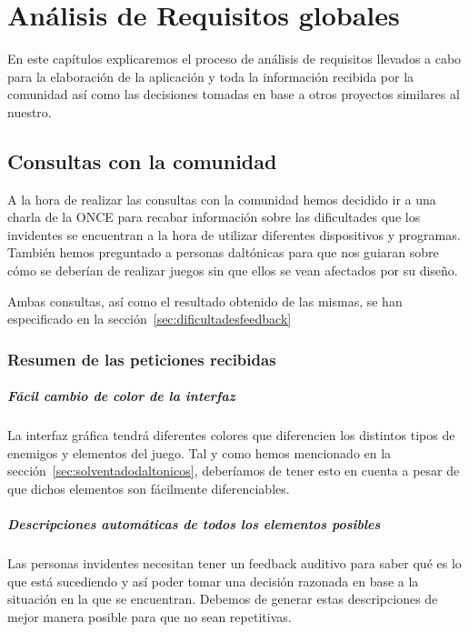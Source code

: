 \chapter[Análisis de Requisitos]{Análisis de Requisitos globales}

En este capítulos explicaremos el proceso de análisis de requisitos llevados a cabo para la elaboración de la aplicación y toda la información recibida por la comunidad así como las decisiones tomadas en base a otros proyectos similares al nuestro.

\section{Consultas con la comunidad}

A la hora de realizar las consultas con la comunidad hemos decidido ir a una charla de la ONCE para recabar información sobre las dificultades que los invidentes se encuentran a la hora de utilizar diferentes dispositivos y programas. 
También hemos preguntado a personas daltónicas para que nos guiaran sobre cómo se deberían de realizar juegos sin que ellos se vean afectados por su diseño.

Ambas consultas, así como el resultado obtenido de las mismas, se han especificado en la sección~\ref{sec:dificultadesfeedback} 

\subsection{Resumen de las peticiones recibidas}
	\paragraph{Fácil cambio de color de la interfaz} La interfaz gráfica tendrá diferentes colores que diferencien los distintos tipos de enemigos y elementos del juego. Tal y como hemos mencionado en la sección~\ref{sec:solventadodaltonicos}, deberíamos de tener esto en cuenta a pesar de que dichos elementos son fácilmente diferenciables.
	\paragraph{Descripciones automáticas de todos los elementos posibles} Las personas invidentes necesitan tener un feedback auditivo para saber qué es lo que está sucediendo y así poder tomar una decisión razonada en base a la situación en la que se encuentran. Debemos de generar estas descripciones de mejor manera posible para que no sean repetitivas. 

